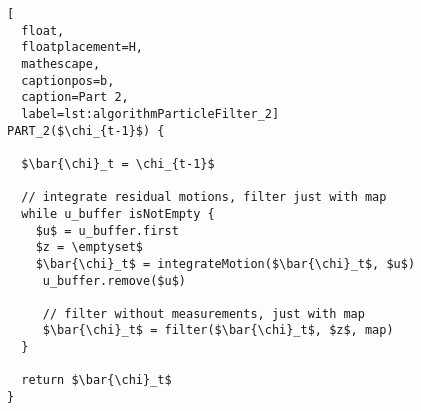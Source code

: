 \begin{lstlisting}[
  float,
  floatplacement=H,
  mathescape,
  captionpos=b,
  caption=Part 2,
  label=lst:algorithmParticleFilter_2]
PART_2($\chi_{t-1}$) {

  $\bar{\chi}_t = \chi_{t-1}$

  // integrate residual motions, filter just with map
  while u_buffer isNotEmpty {
    $u$ = u_buffer.first
    $z = \emptyset$
    $\bar{\chi}_t$ = integrateMotion($\bar{\chi}_t$, $u$)
     u_buffer.remove($u$)

     // filter without measurements, just with map
     $\bar{\chi}_t$ = filter($\bar{\chi}_t$, $z$, map)
  }

  return $\bar{\chi}_t$
}
\end{lstlisting}
